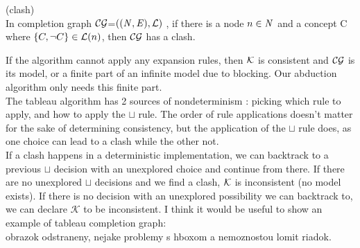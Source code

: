 	\begin{mydef} (clash)\\
		In completion graph $\mathcal{CG}$=$( (\mathit{N}, \mathit{E}),\mathcal{L})$ , if there is a node $n \in \mathit{N}$ and a concept C where $\{ C , \neg C \} \in \mathcal{L} (n)$, then $\mathcal{CG}$ has a clash.
	
\end{mydef}
If the algorithm cannot apply any expansion rules, then $\mathcal{K}$ is consistent and $\mathcal{CG}$ is its model, or a finite part of an infinite model due to blocking. Our abduction algorithm only needs this finite part.\\
 The tableau algorithm has 2 sources of nondeterminism : picking which rule to apply, and how to apply the $\sqcup$ rule. The order of rule applications doesn't matter for the sake of determining consistency, but the application of the $\sqcup$ rule does, as one choice can lead to a clash while the other not. \\ 
If a clash happens in a deterministic implementation, we can backtrack to a previous $\sqcup$ decision with an unexplored choice and continue from there. If there are no unexplored $\sqcup$ decisions and we find a clash, $\mathcal{K}$ is inconsistent (no model exists).     
If there is no decision with an unexplored possibility we can backtrack to, we can declare $\mathcal{K}$ to be inconsistent. 
I think it would be useful to show an example of tableau completion graph:
\\
obrazok odstraneny, nejake problemy s hboxom a nemoznostou lomit riadok.
%

